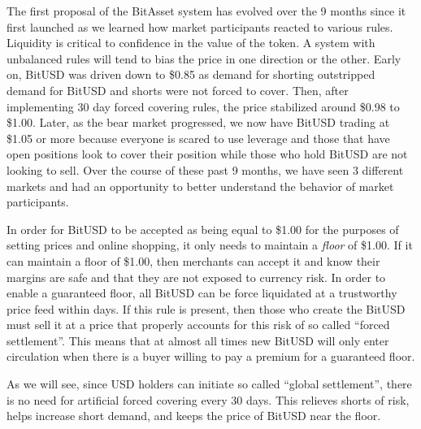 The first proposal of the BitAsset system has evolved over the 9 months since
it first launched as we learned how market participants reacted to various
rules. Liquidity is critical to confidence in the value of the token. A system
with unbalanced rules will tend to bias the price in one direction or the
other. Early on, BitUSD was driven down to \$0.85 as demand for shorting
outstripped demand for BitUSD and shorts were not forced to cover. Then, after
implementing 30 day forced covering rules, the price stabilized around \$0.98 to
\$1.00. Later, as the bear market progressed, we now have BitUSD trading at
\$1.05 or more because everyone is scared to use leverage and those that have
open positions look to cover their position while those who hold BitUSD are not
looking to sell. Over the course of these past 9 months, we have seen 3
different markets and had an opportunity to better understand the behavior of
market participants.

In order for BitUSD to be accepted as being equal to \$1.00 for the purposes of
setting prices and online shopping, it only needs to maintain a \emph{floor} of
\$1.00. If it can maintain a floor of \$1.00, then merchants can accept it and
know their margins are safe and that they are not exposed to currency risk. In
order to enable a guaranteed floor, all BitUSD can be force liquidated at a
trustworthy price feed within days. If this rule is present, then those who
create the BitUSD must sell it at a price that properly accounts for this risk
of so called ``forced settlement''. This means that at almost all times new
BitUSD will only enter circulation when there is a buyer willing to pay a
premium for a guaranteed floor.

As we will see, since USD holders can initiate so called ``global settlement'',
there is no need for artificial forced covering every 30 days. This relieves
shorts of risk, helps increase short demand, and keeps the price of BitUSD near
the floor.
